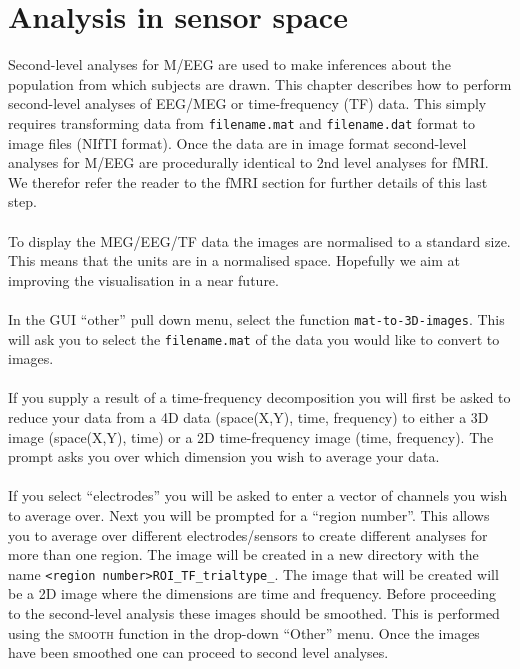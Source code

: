 \chapter{Analysis in sensor space \label{Chap:eeg:sensoranalysis}}

Second-level analyses for M/EEG are used to make inferences about the population from which subjects are drawn. This chapter describes how to perform second-level analyses of EEG/MEG or time-frequency (TF) data. This simply requires transforming data from \texttt{filename.mat} and \texttt{filename.dat}
format to image files (NIfTI format). Once the data are in image format second-level analyses for M/EEG are procedurally identical to 2nd level analyses for fMRI.
We therefor refer the reader to the fMRI section for further details of this last step.
\\
\\
To display the MEG/EEG/TF data the images are normalised to a standard size. This means that the units are in a normalised space. Hopefully we aim at improving the visualisation in a near future.
\\
\\
In the GUI ``other'' pull down menu, select the function \texttt{mat-to-3D-images}. This will ask you to select the \texttt{filename.mat} of the data you would like to convert to images.
\\
\\
If you supply a result of a time-frequency decomposition you will first be asked to reduce your data from a 4D data (space(X,Y), time, frequency) to either a 3D image (space(X,Y), time) or a 2D time-frequency image (time, frequency). The prompt asks you over which dimension you wish to average your data.
\\
\\
If you select ``electrodes'' you will be asked to enter a vector of channels you wish to average over. Next you will be prompted for a ``region number''. This allows you to average over different electrodes/sensors to create different analyses for more than one region. The image will be created in a new directory with the name \texttt{<region number>ROI\_TF\_trialtype\_<condition number>}. The image that will be created will be a 2D image where the dimensions are time and frequency. Before proceeding to the second-level analysis these images should be smoothed. This is performed using the \textsc{smooth} function in the drop-down ``Other'' menu. Once the images have been smoothed one can proceed to second level analyses.
\\

